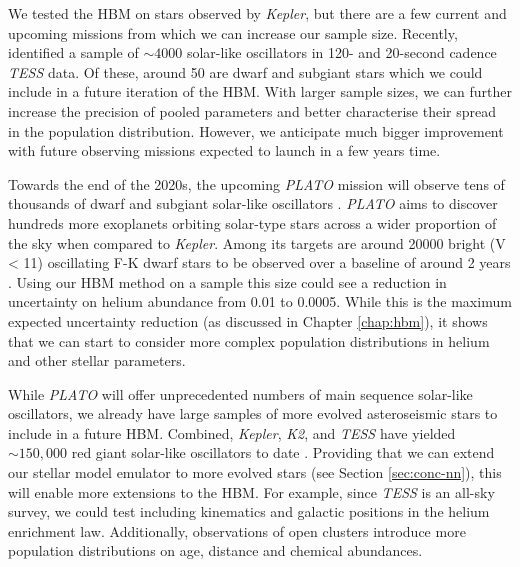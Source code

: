 

We tested the HBM on stars observed by \emph{Kepler}, but there are a few current and upcoming missions from which we can increase our sample size. Recently, \citet{Hatt.Nielsen.ea2023} identified a sample of \(\sim 4000\) solar-like oscillators in 120- and 20-second cadence \emph{TESS} data. Of these, around 50  are dwarf and subgiant stars which we could include in a future iteration of the HBM. With larger sample sizes, we can further increase the precision of pooled parameters and better characterise their spread in the population distribution. However, we anticipate much bigger improvement with future observing missions expected to launch in a few years time.


Towards the end of the 2020s, the upcoming \emph{PLATO} mission will observe tens of thousands of dwarf and subgiant solar-like oscillators \citep{Rauer.Catala.ea2014}. \emph{PLATO} aims to discover hundreds more exoplanets orbiting solar-type stars across a wider proportion of the sky when compared to \emph{Kepler}. Among its targets are around \num{20000} bright (V < 11) oscillating F-K dwarf stars to be observed over a baseline of around 2 years \citep{Goupil2017}. Using our HBM method on a sample this size could see a reduction in uncertainty on helium abundance from 0.01 to 0.0005. While this is the maximum expected uncertainty reduction (as discussed in Chapter \ref{chap:hbm}), it shows that we can start to consider more complex population distributions in helium and other stellar parameters.

While \emph{PLATO} will offer unprecedented numbers of main sequence solar-like oscillators, we already have large samples of more evolved asteroseismic stars to include in a future HBM. Combined, \emph{Kepler}, \emph{K2}, and \emph{TESS} have yielded \(\sim 150,000\) red giant solar-like oscillators to date \citep{Hon.Huber.ea2021,Yu.Huber.ea2018}. Providing that we can extend our stellar model emulator to more evolved stars (see Section \ref{sec:conc-nn}), this will enable more extensions to the HBM. For example, since \emph{TESS} is an all-sky survey, we could test including kinematics and galactic positions in the helium enrichment law. Additionally, observations of open clusters introduce more population distributions on age, distance and chemical abundances.

